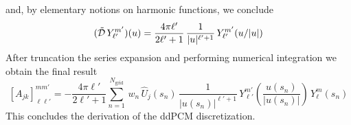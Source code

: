 and, by elementary notions on harmonic functions, we conclude
\[
(\tilde{\mathcal{D}} \, Y_{\ell'}^{m'})(u) = \frac{4 \pi \ell'}{2 \ell' + 1} \, \frac{1}{|u|^{\ell' + 1}} \,  Y_{\ell'}^{m'}(u/|u|)
\]
After truncation the series expansion and performing numerical integration we obtain the final result
\begin{equation}\label{eq:ajk}
[A_{jk}]_{\ell \ell'}^{m m'} =-  \frac{4 \pi \ell'}{2 \ell' + 1}  \sum_{n=1}^{N_\text{grid}} \, w_n  \,  \hat{U}_j(s_n) \, \frac{1}{|u(s_n)|^{\ell' + 1}} \, Y_{\ell'}^{m'}\left(\frac{u(s_n)}{|u(s_n)|}\right) \, Y_{\ell}^{m}(s_n)
\end{equation}
This concludes the derivation of the ddPCM discretization.